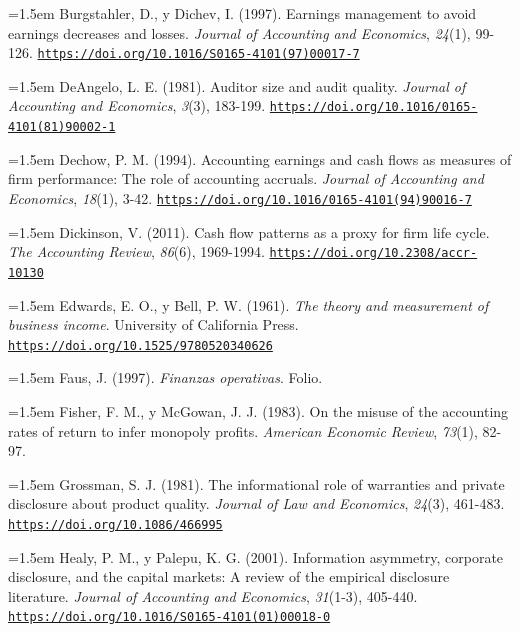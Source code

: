 \documentclass[10pt,a4paper]{article}
\begin{document}
\noindent\hangindent=1.5em Burgstahler, D., y Dichev, I. (1997). Earnings management to avoid earnings decreases and losses. \textit{Journal of Accounting and Economics}, \textit{24}(1), 99-126. \href{https://doi.org/10.1016/S0165-4101(97)00017-7}{\nolinkurl{https://doi.org/10.1016/S0165-4101(97)00017-7}}

\noindent\hangindent=1.5em DeAngelo, L. E. (1981). Auditor size and audit quality. \textit{Journal of Accounting and Economics}, \textit{3}(3), 183-199. \href{https://doi.org/10.1016/0165-4101(81)90002-1}{\nolinkurl{https://doi.org/10.1016/0165-4101(81)90002-1}}

\noindent\hangindent=1.5em Dechow, P. M. (1994). Accounting earnings and cash flows as measures of firm performance: The role of accounting accruals. \textit{Journal of Accounting and Economics}, \textit{18}(1), 3-42. \href{https://doi.org/10.1016/0165-4101(94)90016-7}{\nolinkurl{https://doi.org/10.1016/0165-4101(94)90016-7}}

\noindent\hangindent=1.5em Dickinson, V. (2011). Cash flow patterns as a proxy for firm life cycle. \textit{The Accounting Review}, \textit{86}(6), 1969-1994. \href{https://doi.org/10.2308/accr-10130}{\nolinkurl{https://doi.org/10.2308/accr-10130}}

\noindent\hangindent=1.5em Edwards, E. O., y Bell, P. W. (1961). \textit{The theory and measurement of business income}. University of California Press. \href{https://doi.org/10.1525/9780520340626}{\nolinkurl{https://doi.org/10.1525/9780520340626}}

\noindent\hangindent=1.5em Faus, J. (1997). \textit{Finanzas operativas}. Folio.

\noindent\hangindent=1.5em Fisher, F. M., y McGowan, J. J. (1983). On the misuse of the accounting rates of return to infer monopoly profits. \textit{American Economic Review}, \textit{73}(1), 82-97.

\noindent\hangindent=1.5em Grossman, S. J. (1981). The informational role of warranties and private disclosure about product quality. \textit{Journal of Law and Economics}, \textit{24}(3), 461-483. \href{https://doi.org/10.1086/466995}{\nolinkurl{https://doi.org/10.1086/466995}}

\noindent\hangindent=1.5em Healy, P. M., y Palepu, K. G. (2001). Information asymmetry, corporate disclosure, and the capital markets: A review of the empirical disclosure literature. \textit{Journal of Accounting and Economics}, \textit{31}(1-3), 405-440. \href{https://doi.org/10.1016/S0165-4101(01)00018-0}{\nolinkurl{https://doi.org/10.1016/S0165-4101(01)00018-0}}
\end{document}
